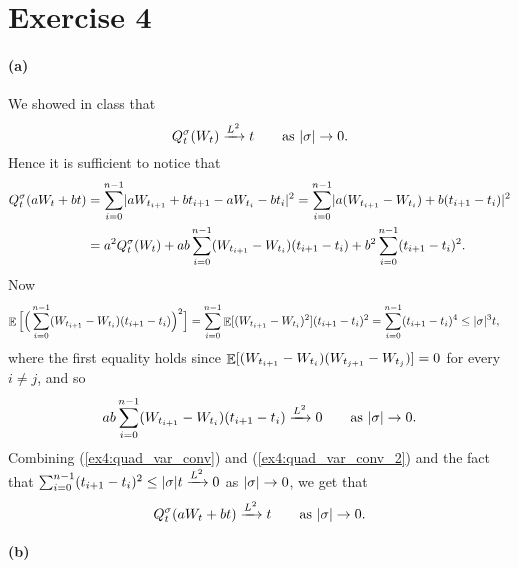 \documentclass[a4paper,11pt]{article}
\theoremstyle{definition}
\theoremstyle{plain}
\theoremstyle{remark}
\DeclarePairedDelimiter{\abs}{\lvert}{\rvert}
\DeclarePairedDelimiter{\parq}{[}{]}
\DeclareMathOperator*{\expval}{\mathbb{E}}
\begin{document}
\section*{Exercise 4}

\paragraph*{(a)}

We showed in class that
\begin{equation}\label{ex4:quad_var_conv}
Q_t^\sigma(W_t) \xrightarrow{L^2} t \qquad \text{as } \abs{\sigma}\to0.
\end{equation}
Hence it is sufficient to notice that
\begin{align*}
Q_t^\sigma(aW_t+bt) & = \sum_{i=0}^{n-1}\abs{aW_{t_{i+1}}+bt_{i+1}-aW_{t_i}-bt_i}^2 = \sum_{i=0}^{n-1}\abs{a(W_{t_{i+1}}-W_{t_i})+b(t_{i+1}-t_i)}^2 \\ & = a^2Q_t^\sigma(W_t) + ab\sum_{i=0}^{n-1}(W_{t_{i+1}}-W_{t_i})(t_{i+1}-t_i) + b^2\sum_{i=0}^{n-1}(t_{i+1}-t_i)^2.
\end{align*}
Now 
\begin{align*}
\expval\Big[\Big(\sum_{i=0}^{n-1}(W_{t_{i+1}}-W_{t_i})(t_{i+1}-t_i)\Big)^2\Big] & = \sum_{i=0}^{n-1}\expval\parq{(W_{t_{i+1}}-W_{t_i})^2}(t_{i+1}-t_i)^2 = \sum_{i=0}^{n-1}(t_{i+1}-t_i)^4 \leq \abs{\sigma}^3t,
\end{align*}
where the first equality holds since $\expval\parq{(W_{t_{i+1}}-W_{t_i})(W_{t_{j+1}}-W_{t_j})}=0$ for every $i\neq j$, and so
\begin{equation}\label{ex4:quad_var_conv_2}
ab\sum_{i=0}^{n-1}(W_{t_{i+1}}-W_{t_i})(t_{i+1}-t_i) \xrightarrow{L^2} 0 \qquad \text{as } \abs{\sigma}\to0.
\end{equation}
Combining (\ref{ex4:quad_var_conv}) and (\ref{ex4:quad_var_conv_2}) and the fact that $\sum_{i=0}^{n-1}(t_{i+1}-t_i)^2\leq\abs{\sigma}t\xrightarrow{L^2} 0$ as $\abs{\sigma}\to0$, we get that 
$$
Q_t^\sigma(aW_t+bt) \xrightarrow{L^2} t \qquad \text{as } \abs{\sigma}\to0.
$$

\paragraph*{(b)}
\end{document}
